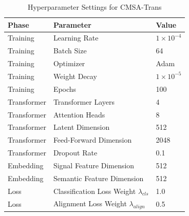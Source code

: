 \begin{table}[htbp]
\centering
\caption{Hyperparameter Settings for CMSA-Trans}
\label{tab:hyperparameters}
\begin{tabular}{p{2.5cm}p{3.5cm}p{3cm}}
\toprule
\textbf{Phase} & \textbf{Parameter} & \textbf{Value} \\
\midrule
Training & Learning Rate & $1 \times 10^{-4}$ \\
\midrule
Training & Batch Size & 64 \\
\midrule
Training & Optimizer & Adam \\
\midrule
Training & Weight Decay & $1 \times 10^{-5}$ \\
\midrule
Training & Epochs & 100 \\
\midrule
Transformer & Transformer Layers & 4 \\
\midrule
Transformer & Attention Heads & 8 \\
\midrule
Transformer & Latent Dimension & 512 \\
\midrule
Transformer & Feed-Forward Dimension & 2048 \\
\midrule
Transformer & Dropout Rate & 0.1 \\
\midrule
Embedding & Signal Feature Dimension & 512 \\
\midrule
Embedding & Semantic Feature Dimension & 512 \\
\midrule
Loss & Classification Loss Weight $\lambda_{cls}$ & 1.0 \\
\midrule
Loss & Alignment Loss Weight $\lambda_{align}$ & 0.5 \\
\bottomrule
\end{tabular}
\end{table}